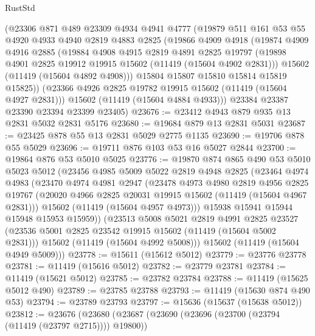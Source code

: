 \begin{lexlean}{RustStd}
\begin{coremodule}
    (@23306
      @871
      @489
      @23309
      @4934
      @4941
      @4777
      (@19879
        @511
        @161
        @53
        @55
        @4920
        @4933
        @4940
        @2819
        @4883
        @2825
        (@19866
          @4909
          @4918
          (@19874
            @4909
            @4916
            @2885
            (@19884
              @4908
              @4915
              @2819
              @4891
              @2825
              @19797
              (@19898 @4901 @2825 @19912 @19915 @15602 (@11419 (@15604 @4902 @2831)))
              @15602
              (@11419 (@15604 @4892 @4908)))
            @15804
            @15807
            @15810
            @15814
            @15819
            @15825))
        (@23366 @4926 @2825 @19782 @19915 @15602 (@11419 (@15604 @4927 @2831)))
        @15602
        (@11419 (@15604 @4884 @4933)))
      @23384
      @23387
      @23390
      @23394
      @23399
      @23405)
@23676 := @23412 @4943 @879 @935 @13 @2831 @5032 @2831 @5176
@23680 := @19684 @879 @13 @2831 @5031
@23687 := @23425 @878 @55 @13 @2831 @5029 @2775 @1135
@23690 := @19706 @878 @55 @5029
@23696 := @19711 @876 @103 @53 @16 @5027 @2844
@23700 := @19864 @876 @53 @5010 @5025
@23776 := @19870
    @874
    @865
    @490
    @53
    @5010
    @5023
    @5012
    (@23456
      @4985
      @5009
      @5022
      @2819
      @4948
      @2825
      (@23464
        @4974
        @4983
        (@23470
          @4974
          @4981
          @2947
          (@23478
            @4973
            @4980
            @2819
            @4956
            @2825
            @19767
            (@20020 @4966 @2825 @20031 @19915 @15602 (@11419 (@15604 @4967 @2831)))
            @15602
            (@11419 (@15604 @4957 @4973)))
          @15938
          @15941
          @15944
          @15948
          @15953
          @15959))
      (@23513
        @5008
        @5021
        @2819
        @4991
        @2825
        @23527
        (@23536 @5001 @2825 @23542 @19915 @15602 (@11419 (@15604 @5002 @2831)))
        @15602
        (@11419 (@15604 @4992 @5008)))
      @15602
      (@11419 (@15604 @4949 @5009)))
@23778 := @15611 (@15612 @5012)
@23779 := @23776 @23778
@23781 := @11419 (@15616 @5012)
@23782 := @23779 @23781
@23784 := @11419 (@15621 @5012)
@23785 := @23782 @23784
@23788 := @11419 (@15625 @5012 @490)
@23789 := @23785 @23788
@23793 := @11419 (@15630 @874 @490 @53)
@23794 := @23789 @23793
@23797 := @15636 (@15637 (@15638 @5012))
@23812 := @23676
    (@23680
      (@23687
        (@23690 (@23696 (@23700 (@23794 (@11419 (@23797 @2715)))) @19800))

\end{coremodule}
\end{lexlean}
